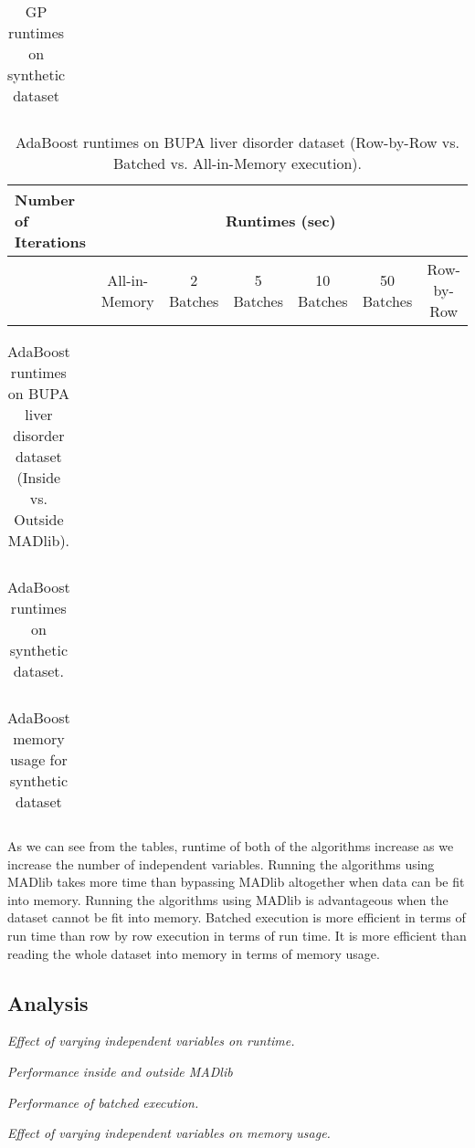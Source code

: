 \begin{table}[!htbp]
\centering
\begin{tabular}{lcc}
\end{tabular}
\caption{GP runtimes on synthetic dataset}
\label{tab:gp}
\end{table}

\begin{table}[!htbp]
\centering
\begin{tabular}{l|c|c|c|c|c|c|}
\hline
\multirow{2}{*}{Number of Iterations} & \multicolumn{6}{|c|}{Runtimes (sec)}\\
\hline
& All-in-Memory & 2 Batches & 5 Batches & 10 Batches & 50 Batches & Row-by-Row\\
\hline
\end{tabular}
\caption{AdaBoost runtimes on BUPA liver disorder dataset (Row-by-Row vs. Batched vs. All-in-Memory execution).}
\label{tab:adaBupa1}
\end{table}

\begin{table}[!htbp]
\centering
\begin{tabular}{lcc}
\end{tabular}
\caption{AdaBoost runtimes on BUPA liver disorder dataset (Inside vs. Outside MADlib).}
\label{tab:adaBupa2}
\end{table}

\begin{table}[!htbp]
\centering
\begin{tabular}{lcc}
\end{tabular}
\caption{AdaBoost runtimes on synthetic dataset.}
\label{tab:adaSynth1}
\end{table}

\begin{table}[!htbp]
\centering
\begin{tabular}{lcc}
\end{tabular}
\caption{AdaBoost memory usage for synthetic dataset}
\label{tab:adaSynth2}
\end{table}

As we can see from the tables, runtime of both of the algorithms increase as we increase the number of independent variables. Running the algorithms using MADlib takes more time than bypassing MADlib altogether when data can be fit into memory. Running the algorithms using MADlib is advantageous when the dataset cannot be fit into memory. Batched execution is more efficient in terms of run time than row by row execution in terms of run time. It is more efficient than reading the whole dataset into memory in terms of memory usage.

\subsection{Analysis}
{\itshape Effect of varying independent variables on runtime.}

{\itshape Performance inside and outside MADlib}

{\itshape Performance of batched execution.}

{\itshape Effect of varying independent variables on memory usage.}
